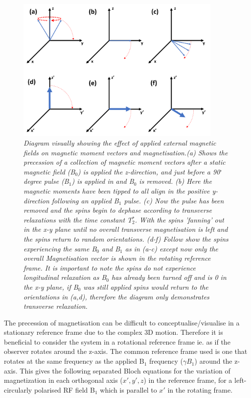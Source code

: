 \begin{figure}
    \centering
    \includegraphics[width=0.9\textwidth]{Figures/Theory/Magnetisation.png}
    \caption{\textit{Diagram visually showing the effect of applied external magnetic fields on magnetic moment vectors and magnetisation.(a) Shows the precession of a collection of magnetic moment vectors after a static magnetic field (B$_0$) is applied the z-direction, and just before a 90$^\circ$ degree pulse (B$_1$) is applied in and B$_0$ is removed. (b) Here the magnetic moments have been tipped to all align in the positive y-direction following an applied B$_1$ pulse. (c) Now the pulse has been removed and the spins begin to dephase according to transverse relaxations with the time constant T$_2^*$. With the spins 'fanning' out in the x-y plane until no overall transverse magnetisation is left and the spins return to random orientations. (d-f) Follow show the spins experiencing the same B$_0$ and B$_1$ as in (a-c) except now only the overall Magnetisation vector is shown in the rotating reference frame. It is important to note the spins do not experience longitudinal relaxation as B$_0$ has already been turned off and is 0 in the x-y plane, if B$_0$ was still applied spins would return to the orientations in (a,d), therefore the diagram only demonstrates transverse relaxation.}}
    \label{fig:theory:Mag}
\end{figure}

The precession of magnetisation can be difficult to conceptualise/visualise in a stationary reference frame due to the complex 3D motion. Therefore it is beneficial to consider the system in a rotational reference frame ie. as if the observer rotates around the z-axis. The common reference frame used is one that rotates at the same frequency as the applied B$_1$ frequency ($\gamma B_1$) around the z-axis. This gives the following separated Bloch equations for the variation of magnetization in each orthogonal axis ($x',y',z$) in the reference frame, for a left-circularly polarised \ac{RF} field B$_1$ which is parallel to $x'$ in the rotating frame.

